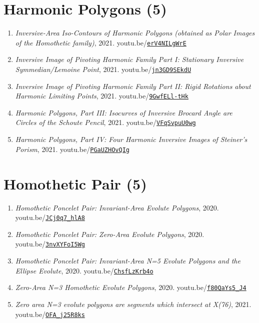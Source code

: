 \documentclass[12pt]{article}
\begin{document}
\section{Harmonic Polygons (5)}

\begin{enumerate}[resume]
\item \textit{Inversive-Area Iso-Contours of Harmonic Polygons (obtained as Polar Images of the Homothetic family)}, 2021. youtu.be/\href{https://youtu.be/erV4NILgWrE}{\nolinkurl{erV4NILgWrE}}
\item \textit{Inversive Image of Pivoting Harmonic Family Part I: Stationary Inversive Symmedian/Lemoine Point}, 2021. youtu.be/\href{https://youtu.be/jn3GD9SEkdU}{\nolinkurl{jn3GD9SEkdU}}
\item \textit{Inversive Image of Pivoting Harmonic Family Part II: Rigid Rotations about Harmonic Limiting Points}, 2021. youtu.be/\href{https://youtu.be/9GwfELl-tHk}{\nolinkurl{9GwfELl-tHk}}
\item \textit{Harmonic Polygons, Part III: Isocurves of Inversive Brocard Angle are Circles of the Schoute Pencil}, 2021. youtu.be/\href{https://youtu.be/VFqSvpuU0wg}{\nolinkurl{VFqSvpuU0wg}}
\item \textit{Harmonic Polygons, Part IV: Four Harmonic Inversive Images of Steiner's Porism}, 2021. youtu.be/\href{https://youtu.be/PGaUZHOvQIg}{\nolinkurl{PGaUZHOvQIg}}
\end{enumerate}

\section{Homothetic Pair (5)}

\begin{enumerate}[resume]
\item \textit{Homothetic Poncelet Pair: Invariant-Area Evolute Polygons}, 2020. youtu.be/\href{https://youtu.be/JCj0q7_hlA8}{\nolinkurl{JCj0q7\_hlA8}}
\item \textit{Homothetic Poncelet Pair: Zero-Area Evolute Polygons}, 2020. youtu.be/\href{https://youtu.be/3nvXYFoI5Wg}{\nolinkurl{3nvXYFoI5Wg}}
\item \textit{Homothetic Poncelet Pair: Invariant-Area N=5 Evolute Polygons and the Ellipse Evolute}, 2020. youtu.be/\href{https://youtu.be/ChsfLzKrb4o}{\nolinkurl{ChsfLzKrb4o}}
\item \textit{Zero-Area N=3 Homothetic Evolute Polygons}, 2020. youtu.be/\href{https://youtu.be/f80QaYs5_J4}{\nolinkurl{f80QaYs5\_J4}}
\item \textit{Zero area N=3 evolute polygons are segments which intersect at X(76)}, 2021. youtu.be/\href{https://youtu.be/OFA_j25R8ks}{\nolinkurl{OFA\_j25R8ks}}
\end{enumerate}
\end{document}
